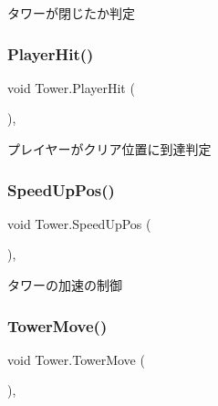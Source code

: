 タワーが閉じたか判定 

\mbox{\label{class_tower_a876271f182e443afbf24c59a5bee3fd9}} 
\subsubsection{\texorpdfstring{Player\+Hit()}{PlayerHit()}}
{\footnotesize\ttfamily void Tower.\+Player\+Hit (\begin{DoxyParamCaption}{ }\end{DoxyParamCaption})\hspace{0.3cm}{\ttfamily [inline]}, {\ttfamily [private]}}



プレイヤーがクリア位置に到達判定 

\mbox{\label{class_tower_ae677bb0263feb2c923801a2c3699796e}} 
\subsubsection{\texorpdfstring{Speed\+Up\+Pos()}{SpeedUpPos()}}
{\footnotesize\ttfamily void Tower.\+Speed\+Up\+Pos (\begin{DoxyParamCaption}{ }\end{DoxyParamCaption})\hspace{0.3cm}{\ttfamily [inline]}, {\ttfamily [private]}}



タワーの加速の制御 

\mbox{\label{class_tower_a5e3288c47bd324050fc3bf3a944b6182}} 
\subsubsection{\texorpdfstring{Tower\+Move()}{TowerMove()}}
{\footnotesize\ttfamily void Tower.\+Tower\+Move (\begin{DoxyParamCaption}{ }\end{DoxyParamCaption})\hspace{0.3cm}{\ttfamily [inline]}, {\ttfamily [private]}}



